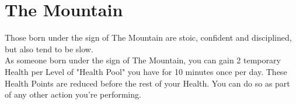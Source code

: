 \section{The Mountain}

Those born under the sign of The Mountain are stoic, confident and disciplined, but also tend to be slow.\\
As someone born under the sign of The Mountain, you can gain 2 temporary Health per Level of "Health Pool" you have for 10 minutes once per day. These Health Points are reduced before the rest of your Health. You can do so as part of any other action you're performing.\\